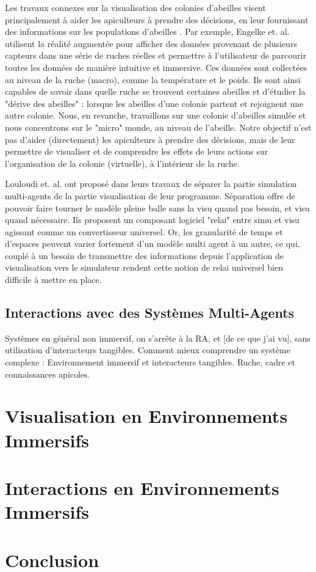 		Les travaux connexes sur la visualisation des colonies d'abeilles visent principalement à aider les apiculteurs à prendre des décisions, en leur fournissant des informations sur les populations d'abeilles \cite{engelke_visual_2016, engelke_melissar_2016, nguyen_augmented_2017}. Par exemple, Engelke et. al. \cite{engelke_visual_2016} utilisent la réalité augmentée pour afficher des données provenant de plusieurs capteurs dans une série de ruches réelles et permettre à l'utilisateur de parcourir toutes les données de manière intuitive et immersive. Ces données sont collectées au niveau de la ruche (macro), comme la température et le poids. Ils sont ainsi capables de savoir dans quelle ruche se trouvent certaines abeilles et d'étudier la "dérive des abeilles" : lorsque les abeilles d'une colonie partent et rejoignent une autre colonie. Nous, en revanche, travaillons sur une colonie d'abeilles simulée et nous concentrons sur le "micro" monde, au niveau de l'abeille. Notre objectif n'est pas d'aider (directement) les apiculteurs à prendre des décisions, mais de leur permettre de visualiser et de comprendre les effets de leurs actions sur l'organisation de la colonie (virtuelle), à l'intérieur de la ruche.
		
		Louloudi et. al. \cite{louloudi_new_2012} ont proposé dans leurs travaux de séparer la partie simulation multi-agents de la partie visualisation de leur programme. Séparation offre de pouvoir faire tourner le modèle pleine balle sans la visu quand pas besoin, et visu quand nécessaire. Ils proposent un composant logiciel "relai" entre simu et visu agissant comme un convertisseur universel. Or, les granularité de temps et d'espaces peuvent varier fortement d'un modèle multi agent à un autre, ce qui, couplé à un besoin de transmettre des informations depuis l'application de visualisation vers le simulateur rendent cette notion de relai universel bien difficile à mettre en place.
		
		
		\subsection{Interactions avec des Systèmes Multi-Agents}
		Systèmes en général non immersif, on s'arrête à la RA, et [de ce que j'ai vu], sans utilisation d'interacteurs tangibles.
	Comment mieux comprendre un système complexe : Environnement immersif et interacteurs tangibles. Ruche, cadre et connaissances apicoles.
	
	
	\section{Visualisation en Environnements Immersifs}
	
	
	
	
	
	\section{Interactions en Environnements Immersifs}			
	\section*{Conclusion}